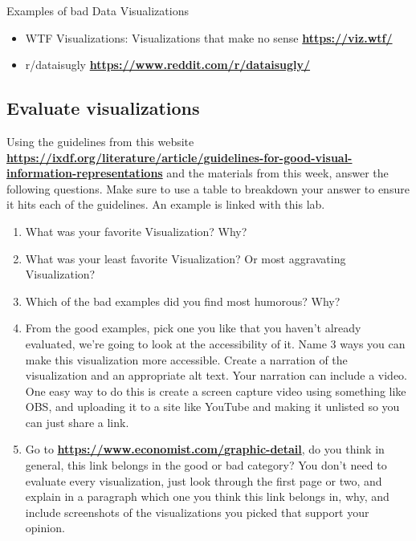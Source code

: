 \documentclass[12pt]{article}
\begin{document}
Examples of bad Data Visualizations
\begin{itemize}
    \item WTF Visualizations: Visualizations that make no sense \href{https://viz.wtf/}{\textbf{https://viz.wtf/}}
    \item r/dataisugly \href{https://www.reddit.com/r/dataisugly/}{\textbf{https://www.reddit.com/r/dataisugly/}}
\end{itemize}



\subsection*{Evaluate visualizations}
Using the guidelines from this website \href{https://web.archive.org/web/20230713094315/https://www.interaction-design.org/literature/article/guidelines-for-good-visual-information-representations\#tufte\%E2\%80\%99s_criteria_for_good_visual_information_representation-1}{\textbf{https://ixdf.org/literature/article/guidelines-for-good-visual-information-representations}} and the materials from this week, answer the following questions.  Make sure to use a table to breakdown your answer to ensure it hits each of the guidelines.  An example is linked with this lab.

    \begin{enumerate}
        \item What was your favorite Visualization? Why? 
        \item What was your least favorite Visualization? Or most aggravating Visualization?
        \item Which of the bad examples did you find most humorous? Why?
        \item From the good examples, pick one you like that you haven't already evaluated, we're going to look at the accessibility of it. Name 3 ways you can make this visualization more accessible.  Create a narration of the visualization and an appropriate alt text.  Your narration can include a video.  One easy way to do this is create a screen capture video using something like OBS, and uploading it to a site like YouTube and making it unlisted so you can just share a link. 
        \item Go to \href{https://www.economist.com/graphic-detail}{\textbf{https://www.economist.com/graphic-detail}}, do you think in general, this link belongs in the good or bad category? You don't need to evaluate every visualization, just look through the first page or two, and explain in a paragraph which one you think this link belongs in, why, and include screenshots of the visualizations you picked that support your opinion.
    \end{enumerate}
\end{document}
